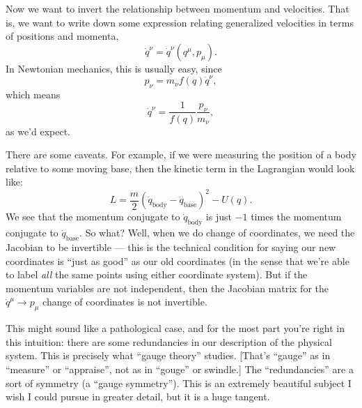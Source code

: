 Now we want to invert the relationship between momentum and
velocities. That is, we want to write down some expression relating
generalized velocities in terms of positions and momenta,
\begin{equation}
\dot{q}^{\nu} = \dot{q}^{\nu}(q^{\mu}, p_{\mu}).
\end{equation}
In Newtonian mechanics, this is usually easy, since
\begin{equation}
p_{\nu} = m_{\nu} f(q)\dot{q}^{\nu},
\end{equation}
which means
\begin{equation}
\dot{q}^{\nu} = \frac{1}{f(q)}\frac{p_{\nu}}{m_{\nu}},
\end{equation}
as we'd expect.

\begin{ddanger}
There are some caveats. For example, if we were measuring the position
of a body relative to some moving base, then the kinetic term in the
Lagrangian would look like:
\begin{equation}
L = \frac{m}{2}(\dot{q}_{\text{body}}-\dot{q}_{\text{base}})^{2} - U(q).
\end{equation}
We see that the momentum conjugate to $\dot{q}_{\text{body}}$ is just
$-1$ times the momentum conjugate to $\dot{q}_{\text{base}}$. So what?
Well, when we do change of coordinates, we need the Jacobian to be
invertible --- this is the technical condition for saying our new
coordinates is ``just as good'' as our old coordinates (in the sense
that we're able to label \emph{all} the same points using either
coordinate system). But if the momentum variables are not independent,
then the Jacobian matrix for the $\dot{q}^{\mu}\to p_{\mu}$ change of
coordinates is not invertible.

This might sound like a pathological case, and for the most part you're
right in this intuition: there are some redundancies in our description
of the physical system. This is precisely what ``gauge theory'' studies.
[That's ``gauge'' as in ``measure'' or ``appraise'', not as in ``gouge''
  or swindle.]
The ``redundancies'' are a sort of symmetry (a ``gauge symmetry''). This
is an extremely beautiful subject I wish I could pursue in greater
detail, but it is a huge tangent.
\end{ddanger}

